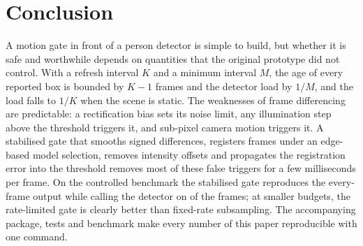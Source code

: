 \section{Conclusion}\label{sec:conclusion}
A motion gate in front of a person detector is simple to build, but whether it is safe and worthwhile depends on quantities that the original prototype did not control. With a refresh interval $K$ and a minimum interval $M$, the age of every reported box is bounded by $K-1$ frames and the detector load by $1/M$, and the load falls to $1/K$ when the scene is static. The weaknesses of frame differencing are predictable: a rectification bias sets its noise limit, any illumination step above the threshold triggers it, and sub-pixel camera motion triggers it. A stabilised gate that smooths signed differences, registers frames under an edge-based model selection, removes intensity offsets and propagates the registration error into the threshold removes most of these false triggers for a few milliseconds per frame. On the controlled benchmark the stabilised gate reproduces the every-frame output while calling the detector on \PolRatioFDS{} of the frames; at smaller budgets, the rate-limited gate is clearly better than fixed-rate subsampling. The accompanying package, tests and benchmark make every number of this paper reproducible with one command.
